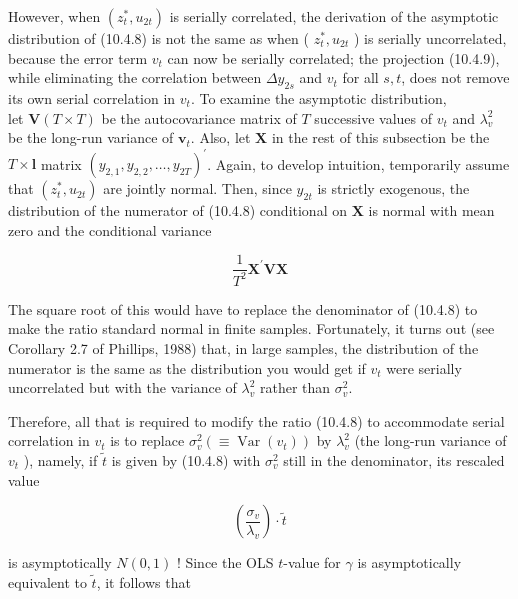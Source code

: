 \documentclass[10pt]{article}
\begin{document}
However, when $\left(z_{t}^{*}, u_{2 t}\right)$ is serially correlated, the derivation of the asymptotic distribution of (10.4.8) is not the same as when ( $z_{t}^{*}, u_{2 t}$ ) is serially uncorrelated, because the error term $v_{t}$ can now be serially correlated; the projection (10.4.9), while eliminating the correlation between $\Delta y_{2 s}$ and $v_{t}$ for all $s, t$, does not remove its own serial correlation in $v_{t}$. To examine the asymptotic distribution,\\
let $\mathbf{V}(T \times T)$ be the autocovariance matrix of $T$ successive values of $v_{t}$ and $\lambda_{v}^{2}$ be the long-run variance of $\boldsymbol{v}_{t}$. Also, let $\mathbf{X}$ in the rest of this subsection be the $T \times \mathbf{l}$ matrix $\left(y_{2,1}, y_{2,2}, \ldots, y_{2 T}\right)^{\prime}$. Again, to develop intuition, temporarily assume that $\left(z_{t}^{*}, u_{2 t}\right)$ are jointly normal. Then, since $y_{2 t}$ is strictly exogenous, the distribution of the numerator of (10.4.8) conditional on $\mathbf{X}$ is normal with mean zero and the conditional variance


\begin{equation*}
\frac{1}{T^{2}} \mathbf{X}^{\prime} \mathbf{V} \mathbf{X} \tag{10.4.12}
\end{equation*}


The square root of this would have to replace the denominator of (10.4.8) to make the ratio standard normal in finite samples. Fortunately, it turns out (see Corollary 2.7 of Phillips, 1988) that, in large samples, the distribution of the numerator is the same as the distribution you would get if $v_{t}$ were serially uncorrelated but with the variance of $\lambda_{v}^{2}$ rather than $\sigma_{v}^{2}$.

Therefore, all that is required to modify the ratio (10.4.8) to accommodate serial correlation in $v_{t}$ is to replace $\sigma_{v}^{2}\left(\equiv \operatorname{Var}\left(v_{t}\right)\right)$ by $\lambda_{v}^{2}$ (the long-run variance of $v_{t}$ ), namely, if $\tilde{t}$ is given by (10.4.8) with $\sigma_{v}^{2}$ still in the denominator, its rescaled value


\begin{equation*}
\left(\frac{\sigma_{v}}{\lambda_{v}}\right) \cdot \tilde{t} \tag{10.4.13}
\end{equation*}


is asymptotically $N(0,1)$ ! Since the OLS $t$-value for $\gamma$ is asymptotically equivalent to $\tilde{t}$, it follows that
\end{document}
